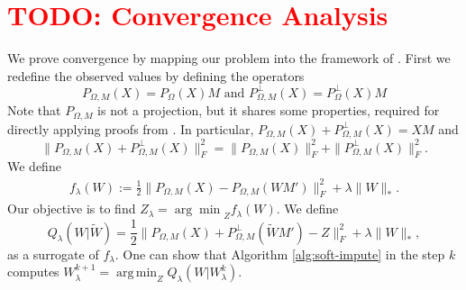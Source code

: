 \documentclass[preprint]{imsart}
\numberwithin{equation}{section}
\theoremstyle{plain}
\newcommand{\tr}[1]{{\textcolor{red}{#1}}}
\DeclareMathOperator*{\argmin}{arg\,min}
\begin{document}





\appendix

\section{\tr{TODO: Convergence Analysis}}\label{s:convergence}

We prove convergence by mapping our problem into the framework of \citet{mazumder2010spectral}. First we redefine the observed values by defining the operators
\[
P_{\Omega,M}(X) = P_\Omega(X)M \text{ and } P_{\Omega,M}^\perp(X) = P_\Omega^\perp(X)M
\]
Note that $P_{\Omega,M}$ is not a projection, but it shares some properties, required for directly applying proofs from \citep{mazumder2010spectral}. In particular, 
$P_{\Omega,M}(X) + P_{\Omega,M}^\perp(X) = XM$ and
\begin{equation}
	\|P_{\Omega,M}(X) + P_{\Omega,M}^\perp(X)\|_F^2 = \|P_{\Omega,M}(X)\|_F^2 + \|P_{\Omega,M}^\perp(X)\|_F^2.
\end{equation} We define
\begin{align}\label{eq:helper-function}
 f_\lambda(W) := \frac{1}{2} \|P_{\Omega,M}(X) - P_{\Omega,M}(WM')\|_F^2 + \lambda\|W\|_*.
\end{align}
Our objective is to find $ Z_\lambda = {\arg\min}_Z f_\lambda(W)$. We define
\[
Q_\lambda(W|\tilde{W}) = \frac{1}{2}\|P_{\Omega,M}(X) + P_{\Omega,M}^{\perp}(\tilde{W} M') - Z\|_F^2 + \lambda \|W\|_*,
\]
as a surrogate of $f_\lambda$. One can show that Algorithm \ref{alg:soft-impute} in the step $k$ computes $W_\lambda^{k+1} = \argmin_Z Q_\lambda(W|W_\lambda^k)$.
\end{document}
